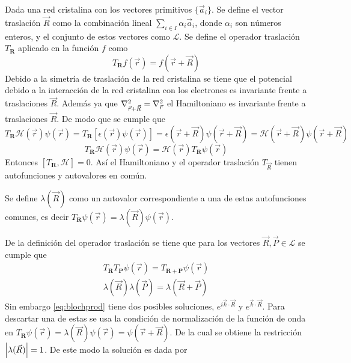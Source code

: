 Dada una red cristalina con los vectores primitivos $\{\vec{a}_i\}$. Se define el vector traslación $\vec{R}$ como la combinación lineal $\sum_{i\in I}\alpha_i\vec{a}_i$, donde $\alpha_i$ son números enteros, y el conjunto de estos vectores como $\mathcal{L}$.
Se define el operador traslación $T_{\mathbf{R}}$ aplicado en la función $f$ como
\begin{equation}
	T_{\mathbf{R}} f(\vec{r}) = f(\vec{r} + \vec{R})
\end{equation}
Debido a la simetría de traslación de la red cristalina se tiene que el potencial debido a la interacción de la red cristalina con los electrones es invariante frente a traslaciones $\vec{R}$. Además ya que $\laplacian_{\vec{r}+\vec{R}} = \laplacian_{\vec{r}}$ el Hamiltoniano es invariante frente a traslaciones $\vec{R}$. De modo que se cumple que
\begin{equation*}
	\nonumber T_{ \mathbf{R}} \mathcal{H}(\vec{r}) \psi(\vec{r}) = T_{\mathbf{R}}\left[\epsilon(\vec{r}) \psi(\vec{r})\right] = \epsilon(\vec{r}+\vec{R}) \psi(\vec{r} + \vec{R}) = \mathcal{H}(\vec{r}+\vec{R})\psi(\vec{r} + \vec{R})
\end{equation*}
\begin{equation}
	T_{ \mathbf{R}} \mathcal{H}(\vec{r}) \psi(\vec{r})= \mathcal{H}(\vec{r}) T_{\mathbf{R}}\psi(\vec{r})
\end{equation}
Entonces $\left[T_{\mathbf{R}} , \mathcal{H}\right] = 0$. Así el Hamiltoniano y el operador traslación $T_{\vec{R}}$ tienen autofunciones y autovalores en común.\par
Se define $\lambda(\vec{R})$ como un autovalor correspondiente a una de estas autofunciones comunes, es decir $T_{\mathbf{R}} \psi(\vec{r}) = \lambda(\vec{R}) \psi(\vec{r})$.\par
De la definición del operador traslación se tiene que para los vectores $\vec{R}, \vec{P} \in \mathcal{L}$ se cumple que
\begin{align}
	\nonumber T_{\mathbf{R}}T_{\mathbf{P}}\psi(\vec{r}) = T_{\mathbf{R} + \mathbf{P}}\psi(\vec{r}) \\
	\lambda(\vec{R}) \lambda(\vec{P}) = \lambda(\vec{R} + \vec{P})\label{eq:blochprod}
\end{align}
Sin embargo \eqref{eq:blochprod} tiene dos posibles soluciones, $e^{i \vec{k}\cdot\vec{R}}$ y $e^{\vec{k}\cdot\vec{R}}$. Para descartar una de estas se usa la condición de normalización de la función de onda en $T_{\mathbf{R}}\psi(\vec{r})=\lambda(\vec{R})\psi(\vec{r})=\psi(\vec{r} + \vec{R})$. De la cual se obtiene la restricción $\abs{\lambda(\vec{R})}=1$. De este modo la solución es dada por
